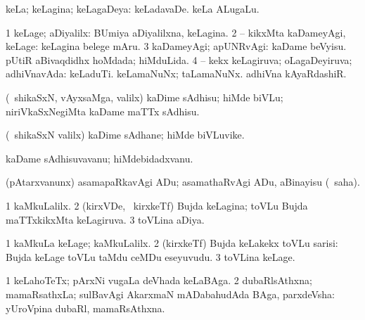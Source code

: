 {\bentry
{} 
\gl{\gu}
\expl{}
\bmng
 keLa; keLagina; keLagaDeya:  keLadavaDe.  keLa ALugaLu. 
\emng
\eentry

\bentry
{} 
\gl{\pUparx}
\expl{}
\bmng
\bnum
\num{1} keLage; aDiyalilx:  BUmiya aDiyalilxna, keLagina. 
\num{2} -- kikxMta kaDameyAgi, keLage:  keLagina belege mAru. 
\num{3} kaDameyAgi; apUNRvAgi:  kaDame beVyisu.  pUtiR aBivaqdidhx hoMdada; hiMduLida. 
\num{4} -- kekx keLagiruva; oLagaDeyiruva; adhiVnavAda:  keLaduTi.  keLamaNuNx; taLamaNuNx.  adhiVna kAyaRdashiR. 
\enum
\emng
\eentry

\bentry
{} 
\gl{\akirx}
\expl{}
\bmng
 (\kanmu\ shikaSxN, vAyxsaMga, \mo valilx) kaDime sAdhisu; hiMde biVLu; niriVkaSxNegiMta kaDame maTTx sAdhisu. 
\emng
\eentry

\bentry
{} 
\gl{\nA}
\expl{}
\bmng
 (\kanmu\ shikaSxN \mo valilx) kaDime sAdhane; hiMde biVLuvike. 
\emng
\eentry

\bentry
{} 
\gl{\nA}
\expl{}
\bmng
 kaDame sAdhisuvavanu; hiMdebidadxvanu. 
\emng
\eentry

\bentry
{} 
\gl{\sakirx}
\expl{}
\bmng
 (pAtarxvanunx) asamapaRkavAgi ADu; asamathaRvAgi ADu, aBinayisu (\akirx\ saha). 
\emng
\eentry

\bentry
{} 
\gl{\gu}
\expl{}
\bmng
\bnum
\num{1} kaMkuLalilx. 
\hypertarget{underarm(1)2}{} 
\num{2} (kirxVDe, \kanmu\ kirxkeTf) Bujda keLagina; toVLu Bujda maTTxkikxMta keLagiruva. 
\num{3} toVLina aDiya. 
\enum
\emng
\eentry

\bentry
{} 
\gl{\kirxvi}
\expl{}
\bmng
\bnum
\num{1} kaMkuLa keLage; kaMkuLalilx. 
\num{2} (kirxkeTf) Bujda keLakekx toVLu sarisi:  Bujda keLage toVLu taMdu ceMDu eseyuvudu. 
\num{3} toVLina keLage. 
\enum
\emng
\eentry

\bentry
{} 
\gl{\nA}
\bmng
\bnum
\num{1} keLahoTeTx; pArxNi \mo vugaLa deVhada keLaBAga. 
\num{2} dubaRlsAthxna; mamaRsathxLa; sulBavAgi AkarxmaN mADabahudAda BAga, parxdeVsha:  yUroVpina dubaRl, mamaRsAthxna. 
\enum
\emng
\eentry

}
